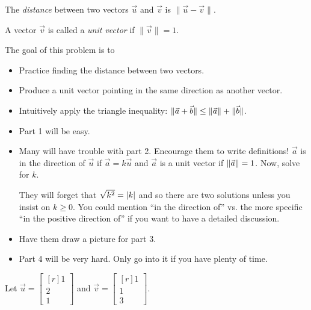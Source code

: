 \documentclass{problemset}
\newcommand{\mat}[1]{\begin{bmatrix*}[r]#1\end{bmatrix*}}
\DeclarePairedDelimiter\abs{\lvert}{\rvert}
\DeclarePairedDelimiter\norm{\lVert}{\rVert}
\begin{document}
	\begin{definition}[Distance]
		The \emph{distance} between two vectors $\vec u$ and $\vec v$ is $\|\vec u-\vec v\|$.
	\end{definition}
	\begin{definition}
		A vector $\vec v$ is called a \emph{unit vector} if $\|\vec v\|=1$.
	\end{definition}

	\question
	\begin{annotation}
		\begin{goals}

			The goal of this problem is to
			\begin{itemize}
				\item Practice finding the distance between two vectors.
				\item Produce a unit vector pointing in the same direction as another vector.
				\item Intuitively apply the triangle inequality: $\norm{\vec a+\vec b}\leq \norm{\vec a}+\norm{\vec b}$.
			\end{itemize}
		\end{goals}

		\begin{notes}
			\begin{itemize}
				\item Part 1 will be easy.
				\item Many will have trouble with part 2. Encourage them to write definitions! $\vec a$ is
					in the direction of $\vec u$ if $\vec a=k\vec u$ and $\vec a$ is a unit vector if $\norm{\vec a}=1$.
					Now, solve for $k$.

					They will forget that $\sqrt{k^2}=\abs{k}$ and so there are two solutions
					unless you insist on $k\geq 0$. You could mention ``in the direction of'' vs. the
					more specific ``in the positive direction of'' if you want to have a detailed discussion.
				\item Have them draw a picture for part 3.
				\item Part 4 will be very hard. Only go into it if you have plenty of time.
			\end{itemize}
		\end{notes}
	\end{annotation}
	Let $\vec u=\mat{1\\2\\1}$ and $\vec v=\mat{1\\1\\3}$.
\end{document}
